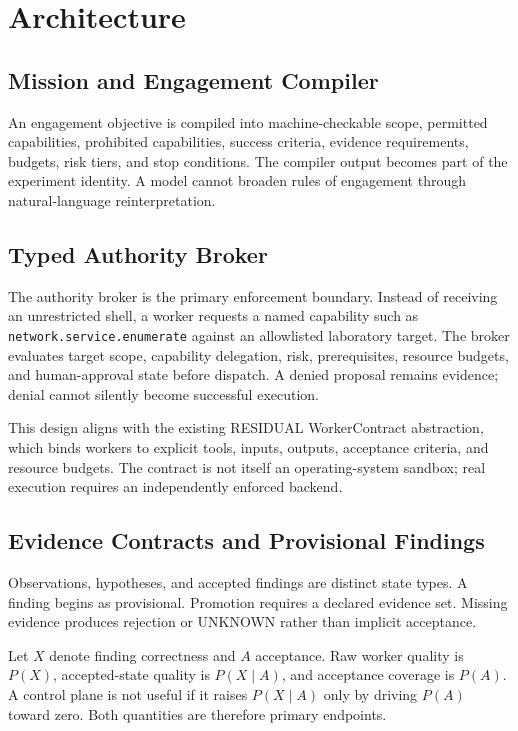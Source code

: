 \documentclass[conference]{IEEEtran}
\begin{document}
\section{Architecture}
\subsection{Mission and Engagement Compiler}
An engagement objective is compiled into machine-checkable scope, permitted capabilities, prohibited capabilities, success criteria, evidence requirements, budgets, risk tiers, and stop conditions. The compiler output becomes part of the experiment identity. A model cannot broaden rules of engagement through natural-language reinterpretation.

\subsection{Typed Authority Broker}
The authority broker is the primary enforcement boundary. Instead of receiving an unrestricted shell, a worker requests a named capability such as \texttt{network.service.enumerate} against an allowlisted laboratory target. The broker evaluates target scope, capability delegation, risk, prerequisites, resource budgets, and human-approval state before dispatch. A denied proposal remains evidence; denial cannot silently become successful execution.

This design aligns with the existing RESIDUAL WorkerContract abstraction, which binds workers to explicit tools, inputs, outputs, acceptance criteria, and resource budgets. The contract is not itself an operating-system sandbox; real execution requires an independently enforced backend.

\subsection{Evidence Contracts and Provisional Findings}
Observations, hypotheses, and accepted findings are distinct state types. A finding begins as provisional. Promotion requires a declared evidence set. Missing evidence produces rejection or UNKNOWN rather than implicit acceptance.

Let $X$ denote finding correctness and $A$ acceptance. Raw worker quality is $P(X)$, accepted-state quality is $P(X \mid A)$, and acceptance coverage is $P(A)$. A control plane is not useful if it raises $P(X \mid A)$ only by driving $P(A)$ toward zero. Both quantities are therefore primary endpoints.
\end{document}
